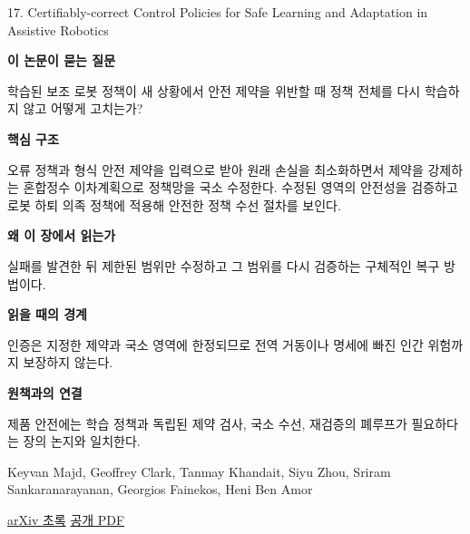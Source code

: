\documentclass[11pt,openany]{book}
\begin{document}
\begin{termcard}{17. Certifiably-correct Control Policies for Safe Learning and Adaptation in Assistive Robotics}

\par

\medskip

{\sffamily\bfseries\color{deepblue} 이 논문이 묻는 질문}\par

학습된 보조 로봇 정책이 새 상황에서 안전 제약을 위반할 때 정책 전체를 다시 학습하지 않고 어떻게 고치는가?

\smallskip

{\sffamily\bfseries\color{deepblue} 핵심 구조}\par

오류 정책과 형식 안전 제약을 입력으로 받아 원래 손실을 최소화하면서 제약을 강제하는 혼합정수 이차계획으로 정책망을 국소 수정한다. 수정된 영역의 안전성을 검증하고 로봇 하퇴 의족 정책에 적용해 안전한 정책 수선 절차를 보인다.

\smallskip

{\sffamily\bfseries\color{deepblue} 왜 이 장에서 읽는가}\par

실패를 발견한 뒤 제한된 범위만 수정하고 그 범위를 다시 검증하는 구체적인 복구 방법이다.

\smallskip

{\sffamily\bfseries\color{coral} 읽을 때의 경계}\par

인증은 지정한 제약과 국소 영역에 한정되므로 전역 거동이나 명세에 빠진 인간 위험까지 보장하지 않는다.

\smallskip

{\sffamily\bfseries\color{teal} 원책과의 연결}\par

제품 안전에는 학습 정책과 독립된 제약 검사, 국소 수선, 재검증의 폐루프가 필요하다는 장의 논지와 일치한다.

\medskip

{\footnotesize\color{muted} Keyvan Majd, Geoffrey Clark, Tanmay Khandait, Siyu Zhou, Sriram Sankaranarayanan, Georgios Fainekos, Heni Ben Amor\par

\href{https://arxiv.org/abs/2303.06582}{arXiv 초록} \quad \href{https://arxiv.org/pdf/2303.06582}{공개 PDF}\par}

\end{termcard}
\end{document}
